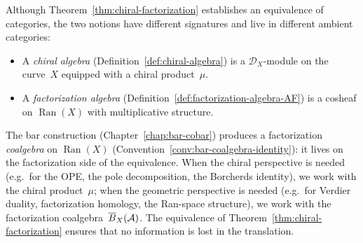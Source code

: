 \begin{remark}
\label{rem:chiral-vs-factorization}
Although Theorem~\ref{thm:chiral-factorization} establishes an
equivalence of categories, the two notions have different
signatures and live in different ambient categories:
\begin{itemize}
\item A \emph{chiral algebra}
  (Definition~\ref{def:chiral-algebra}) is a
  $\mathcal{D}_X$-module on the curve~$X$ equipped with a
  chiral product~$\mu$.
\item A \emph{factorization algebra}
  (Definition~\ref{def:factorization-algebra-AF}) is a
  cosheaf on $\operatorname{Ran}(X)$ with multiplicative
  structure.
\end{itemize}
The bar construction
(Chapter~\ref{chap:bar-cobar}) produces a factorization
\emph{coalgebra} on $\operatorname{Ran}(X)$
(Convention~\ref{conv:bar-coalgebra-identity}): it lives on
the factorization side of the equivalence.  When the chiral
perspective is needed (e.g.\ for the OPE, the pole
decomposition, the Borcherds identity), we work with the
chiral product~$\mu$; when the geometric perspective is needed
(e.g.\ for Verdier duality, factorization homology, the
Ran-space structure), we work with the factorization
coalgebra~$\overline{B}_X(\mathcal{A})$.  The equivalence of
Theorem~\ref{thm:chiral-factorization} ensures that no
information is lost in the translation.
\end{remark}

